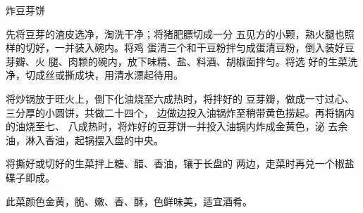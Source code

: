 \begin{recipe}{炸豆芽饼}

\ingredients



\cooking

\step 先将豆芽的渣皮选净，淘洗干净；将猪肥膘切成一分 五见方的小颗，熟火腿也照样的切好，一并装入碗内。将鸡 蛋清三个和干豆粉拌匀成蛋清豆粉，倒入装好豆芽瓣、火 腿、肉颗的碗内，放下味精、盐、料酒、胡椒面拌匀。将选 好的生菜洗净，切成丝或撕成块，用清水漂起待用。

\step 将炒锅放于旺火上，倒下化油烧至六成热时，将拌好的 豆芽瓣，做成一寸过心、三分厚的小圆饼，共做二十四个， 边做边投入油锅炸至稍带黄色捞起。再将锅内的油烧至七、 八成热时，将炸好的豆芽饼一并投入油锅内炸成金黄色，泌 去余油，淋入香油，起锅摆入盘的中央。

\step 将撕好或切好的生菜拌上糖、醋、香油，镶于长盘的 两边，走菜时再兑一个椒盐碟子即成。

\notes

此菜颜色金黄，脆、嫩、香、酥，色鲜味美，适宜酒肴。

\end{recipe}

